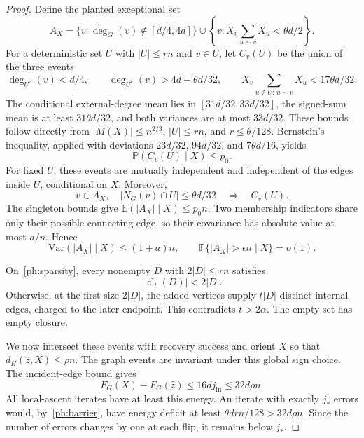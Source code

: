 \documentclass[11pt]{article}
\newcommand{\Var}{\mathrm{Var}}
\def\P{\mathbb{P}}
\def\E{\mathbb{E}}
\numberwithin{equation}{section}
\begin{document}
\begin{proof}
Define the planted exceptional set
\begin{equation}\label{ph:planted_bad}
 A_X=\{v:\deg_G(v)\notin[d/4,4d]\}
       \cup\left\{v:X_v\sum_{u\sim v}X_u<\theta d/2\right\}.
\end{equation}
For a deterministic set $U$ with $|U|\le rn$ and $v\in U$, let $C_v(U)$ be the union of the three events
\begin{equation}\label{ph:external_tests}
 \deg_{U^c}(v)<d/4,\qquad
 \deg_{U^c}(v)>4d-\theta d/32,\qquad
 X_v\sum_{u\notin U:\,u\sim v}X_u<17\theta d/32.
\end{equation}
The conditional external-degree mean lies in $[31d/32,33d/32]$, the signed-sum mean is at least $31\theta d/32$, and both variances are at most $33d/32$. These bounds follow directly from $|M(X)|\le n^{2/3}$, $|U|\le rn$, and $r\le\theta/128$. Bernstein's inequality, applied with deviations $23d/32$, $94d/32$, and $7\theta d/16$, yields
\begin{equation}\label{ph:external_prob}
    \P(C_v(U)\mid X)\le p_0.
\end{equation}
For fixed $U$, these events are mutually independent and independent of the edges inside $U$, conditional on $X$. Moreover,
\begin{equation}\label{ph:external_implication}
 v\in A_X,\quad |N_G(v)\cap U|\le\theta d/32
       \quad\Longrightarrow\quad C_v(U).
\end{equation}
The singleton bounds give $\E(|A_X|\mid X)\le p_0n$. Two membership indicators share only their possible connecting edge, so their covariance has absolute value at most $a/n$. Hence
\[
    \Var(|A_X|\mid X)\le(1+a)n,
    \qquad \P\{|A_X|>\epsilon n\mid X\}=o(1).
\]

On~\eqref{ph:sparsity}, every nonempty $D$ with $2|D|\le rn$ satisfies
\begin{equation}\label{ph:closure_size}
    |\operatorname{cl}_t(D)|<2|D|.
\end{equation}
Otherwise, at the first size $2|D|$, the added vertices supply $t|D|$ distinct internal edges, charged to the later endpoint. This contradicts $t>2\alpha$. The empty set has empty closure.

We now intersect these events with recovery success and orient $X$ so that $d_H(\widehat z,X)\le\rho n$. The graph events are invariant under this global sign choice. The incident-edge bound gives
\[
    F_G(X)-F_G(\widehat z)\le16dj_{\mathrm{in}}\le32d\rho n.
\]
All local-ascent iterates have at least this energy. An iterate with exactly $j_*$ errors would, by~\eqref{ph:barrier}, have energy deficit at least $\theta drn/128>32d\rho n$. Since the number of errors changes by one at each flip, it remains below $j_*$.


\end{proof}
\end{document}
